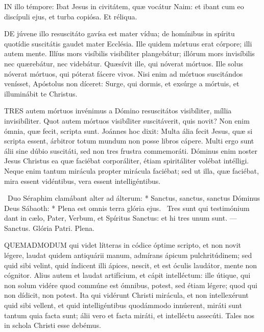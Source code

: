 


\lettrine[lines=2]{I}{N} illo témpore: Ibat Jesus in civitátem, quæ vocátur Naim: et ibant cum eo discípuli ejus, et turba copiósa. Et réliqua.



\lettrine[lines=2]{D}{E} júvene illo resuscitáto gavísa est mater vídua; de homínibus in spíritu quotídie suscitátis gaudet mater Ecclésia. Ille quidem mórtuus erat córpore; illi autem mente. Illíus mors visíbilis visibíliter plangebátur; illórum mors invisíbilis nec quærebátur, nec videbátur. Quæsívit ille, qui nóverat mórtuos. Ille solus nóverat mórtuos, qui póterat fácere vivos. Nisi enim ad mórtuos suscitándos venísset, Apóstolus non díceret: Surge, qui dormis, et exsúrge a mórtuis, et illuminábit te Christus.



\lettrine[lines=2]{T}{RES} autem mórtuos invénimus a Dómino resuscitátos visibíliter, míllia invisibíliter. Quot autem mórtuos visibíliter suscitáverit, quis novit? Non enim ómnia, quæ fecit, scripta sunt. Joánnes hoc dixit: Multa ália fecit Jesus, quæ si scripta essent, árbitror totum mundum non posse libros cápere. Multi ergo sunt álii sine dúbio suscitáti, sed non tres frustra commemoráti. Dóminus enim noster Jesus Christus ea quæ faciébat corporáliter, étiam spiritáliter volébat intélligi. Neque enim tantum mirácula propter mirácula faciébat; sed ut illa, quæ faciébat, mira essent vidéntibus, vera essent intelligéntibus.

\R\ Duo Séraphim clamábant alter ad álterum: * Sanctus, sanctus, sanctus Dóminus Deus Sábaoth: * Plena est omnis terra glória ejus. \V\ Tres sunt qui testimónium dant in cælo, Pater, Verbum, et Spíritus Sanctus: et hi tres unum sunt. — Sanctus. Glória Patri. Plena.


\lettrine[lines=2]{Q}{UEMADMODUM} qui videt lítteras in códice óptime scripto, et non novit légere, laudat quidem antiquárii manum, admírans ápicum pulchritúdinem; sed quid sibi velint, quid índicent illi ápices, nescit, et est óculis laudátor, mente non cógnitor. Alius autem et laudat artifícium, et cápit intelléctum: ille útique, qui non solum vidére quod commúne est ómnibus, potest, sed étiam légere; quod qui non dídicit, non potest. Ita qui vidérunt Christi mirácula, et non intellexérunt quid sibi vellent, et quid intelligéntibus quodámmodo innúerent, miráti sunt tantum quia facta sunt; álii vero et facta miráti, et intelléctu assecúti. Tales nos in schola Christi esse debémus.

